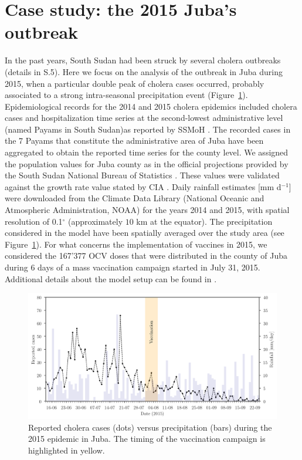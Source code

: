 \section{Case study: the 2015 Juba's outbreak}
\label{sec:data sets}
 In the past years, South Sudan had been struck by several cholera outbreaks (details in S.5). Here we focus on the analysis of the outbreak in Juba during 2015, when a particular double peak of cholera cases occurred, probably associated to a strong intra-seasonal precipitation event (Figure~\ref{fig:report}). Epidemiological records for the 2014 and 2015 cholera epidemics included cholera cases and hospitalization time series at the second-lowest administrative level  (named Payams in South Sudan)as reported by SSMoH \cite{abubakar15,azman16,parker17}. The recorded cases in the 7 Payams that constitute the administrative area of Juba have been aggregated to obtain the reported time series for the county level. We assigned the population values for Juba county as in the official projections provided by the South Sudan National Bureau of Statistics \cite{county_projectionSSNBS}.
These values were validated against the growth rate value stated by CIA \cite{CIA2015}. Daily rainfall estimates [mm d$^{-1}$] were downloaded from the Climate Data Library (National Oceanic and Atmospheric Administration, NOAA) \cite{rain} for the years 2014 and 2015, with spatial resolution of {0.1}$^\circ$ (approximately $10$ km at the equator). The precipitation considered in the model have been spatially averaged over the study area (see Figure~\ref{fig:report}). For what concerns the implementation of vaccines in 2015, we considered the 167'377 OCV doses that were distributed in the county of Juba~\cite{parker17} during 6 days of a mass vaccination campaign started in July 31, 2015. Additional details about the model setup can be found in \cite{sciarra16}.

\begin{figure}
  \centering
  \includegraphics[width=\textwidth]{fig_cholera-rainfall/Lemaitre_ACTROP_2018_42_R1_fig2.png}
  \caption{Reported cholera cases (dots) versus precipitation (bars) during the 2015 epidemic in Juba. The timing of the vaccination campaign is highlighted in yellow.}
  \label{fig:report}
\end{figure}

